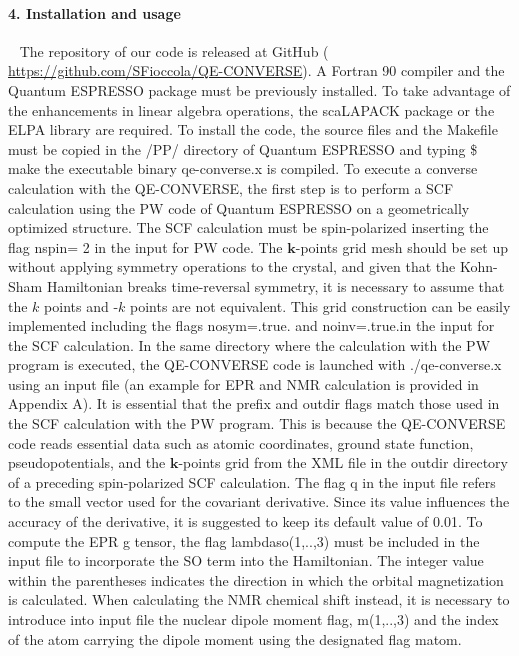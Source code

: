 \documentclass[final,3p,times,twocolumn]{elsarticle}
\begin{document}
\begin{small}
\paragraph{4. Installation and usage} \
\vskip0.5cm
\noindent
The repository of our code is released at GitHub (
\url{https://github.com/SFioccola/QE-CONVERSE}).
A Fortran 90 compiler and the Quantum ESPRESSO package must be previously installed. To take advantage of the enhancements in linear algebra operations, the scaLAPACK package or the ELPA library are required.
To install the code, the source files and the {\selectfont Makefile} must be copied in the {\selectfont /PP/} directory of Quantum ESPRESSO and typing {\selectfont \$ make} the executable binary {\selectfont qe-converse.x} is compiled. To execute a converse calculation with the {\selectfont QE-CONVERSE}, the first step is to perform a SCF calculation using the {\selectfont PW} code of Quantum ESPRESSO on a geometrically optimized structure. The SCF calculation must be spin-polarized inserting the flag {\selectfont nspin= 2} in the input for {\selectfont PW} code. The $\mathbf{k}$-points grid mesh should be set up without applying symmetry operations to the crystal, and given that the Kohn-Sham Hamiltonian breaks time-reversal symmetry, it is necessary to assume that the $k$ points and -$k$ points are not equivalent. This grid construction can be easily implemented including the flags {\selectfont nosym=.true.} and {\selectfont noinv=.true.}in the input for the SCF calculation. In the same directory where the calculation with the {\selectfont PW} program is executed, the {\selectfont QE-CONVERSE} code is launched with {\fontfamily{qcr}\selectfont ./qe-converse.x}  using an input file (an example for EPR and NMR calculation is provided in Appendix A). It is essential that the 
{\fontfamily{qcr}\selectfont prefix} and {\fontfamily{qcr}\selectfont outdir} flags match those used in the SCF calculation with the {\fontfamily{qcr}\selectfont PW} program. This is because the {\fontfamily{qcr}\selectfont QE-CONVERSE} code reads essential data such as atomic coordinates, ground state function, pseudopotentials, and the $\mathbf{k}$-points grid from the XML file in the {\fontfamily{qcr}\selectfont outdir} directory of a preceding spin-polarized SCF calculation. The flag {\fontfamily{qcr}\selectfont q} in the input file refers to the small vector used for the covariant derivative. Since its value influences the accuracy of the derivative, it is suggested to keep its default value of 0.01. To compute the EPR g tensor, the flag {\fontfamily{qcr}\selectfont lambda\textunderscore so(1,..,3)} must be included in the input file to incorporate the SO term into the Hamiltonian. The integer value within the parentheses indicates the direction in which the orbital magnetization is calculated. When calculating the NMR chemical shift instead, it is necessary to introduce into input file the nuclear dipole moment flag, {\fontfamily{qcr}\selectfont m\textunderscore0(1,..,3)} and the index of the atom carrying the dipole moment using the designated flag {\fontfamily{qcr}\selectfont m\textunderscore0\textunderscore atom}.

\end{small}
\end{document}
